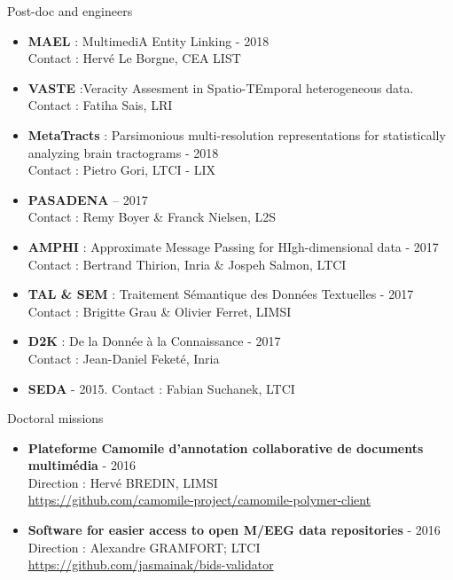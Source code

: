 \begin{frame}{Post-doc and engineers}

\small
\begin{itemize}
\item 
\textbf{MAEL} : MultimediA Entity Linking - 2018
\\
Contact : Herv\'e Le Borgne, CEA LIST
\item
\textbf{VASTE} :Veracity Assesment in Spatio-TEmporal heterogeneous data. 
\\
Contact : Fatiha Sais, LRI
\item
\textbf{MetaTracts} : Parsimonious multi-resolution representations for 
statistically analyzing brain tractograms - 2018
\\
Contact : Pietro Gori, LTCI - LIX
\item
\textbf{PASADENA} 
– 2017
\\
Contact : Remy Boyer \& Franck Nielsen, L2S
\item
\textbf{AMPHI} : Approximate Message Passing for HIgh-dimensional data -  2017 
\\
Contact : Bertrand Thirion, Inria \& Jospeh Salmon, LTCI
\item
\textbf{TAL \& SEM} : Traitement S\'emantique des Donn\'ees Textuelles - 2017
\\
Contact : Brigitte Grau \& Olivier Ferret, LIMSI
\item
\textbf{D2K} : De la Donn\'ee \`a la Connaissance - 2017
\\
Contact : Jean-Daniel Feket\'e, Inria
\item
\textbf{SEDA} - 2015. Contact : Fabian Suchanek, LTCI
\end{itemize}
\end{frame}

\begin{frame}{Doctoral missions}

\begin{itemize}
\item
\textbf{
Plateforme Camomile d'annotation collaborative de documents multim\'edia} - 2016 \\
Direction : Herv\'e BREDIN, LIMSI \\
\url{https://github.com/camomile-project/camomile-polymer-client}
\item
\textbf{Software for easier access to open M/EEG data repositories} - 2016 \\ 
Direction : Alexandre GRAMFORT; LTCI
\url{https://github.com/jasmainak/bids-validator}
\end{itemize}
\end{frame}

